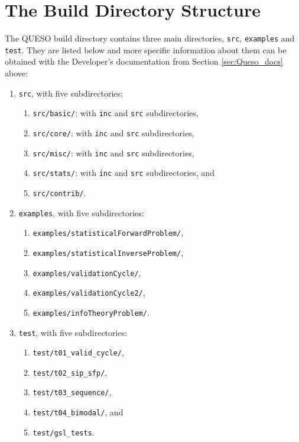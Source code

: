 % 
% 


\section{The Build Directory Structure} \label{sc-source-dir-structure}

The QUESO build directory contains three main directories, \texttt{src}, \texttt{examples} and \texttt{test}. They are listed below and more specific
information about them can be obtained with the Developer's documentation from Section \ref{sec:Queso_docs} above:
\begin{enumerate}
\item \texttt{src}, with five subdirectories:
\begin{enumerate}
\item \texttt{src/basic/}: with \texttt{inc} and \texttt{src} subdirectories,
\item \texttt{src/core/}:  with \texttt{inc} and \texttt{src} subdirectories,
\item \texttt{src/misc/}:  with \texttt{inc} and \texttt{src} subdirectories,
\item \texttt{src/stats/}: with \texttt{inc} and \texttt{src} subdirectories, and
\item \texttt{src/contrib/}.
\end{enumerate}

\item \texttt{examples}, with five subdirectories:
\begin{enumerate}
\item \texttt{examples/statisticalForwardProblem/},
\item \texttt{examples/statisticalInverseProblem/},
\item \texttt{examples/validationCycle/}, 
\item \texttt{examples/validationCycle2/},
\item \texttt{examples/infoTheoryProblem/}.
\end{enumerate}

\item  \texttt{test}, with five subdirectories:
\begin{enumerate}
\item \texttt{test/t01\_valid\_cycle/},
\item \texttt{test/t02\_sip\_sfp/},
\item \texttt{test/t03\_sequence/}, 
\item \texttt{test/t04\_bimodal/}, and
\item \texttt{test/gsl\_tests}.
\end{enumerate}

\end{enumerate}

